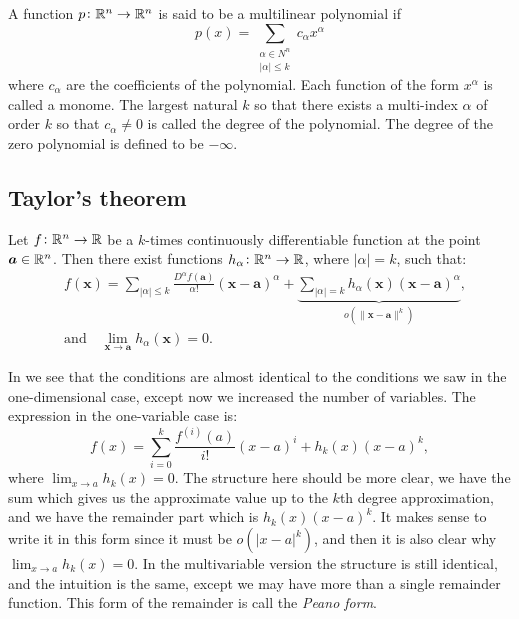 \documentclass[11pt,a4paper]{article}
\begin{document}
\begin{definition}
  A function $p \colon \mathbb{R}^n \to \mathbb{R}^n$ is said to be a multilinear polynomial
  if
  \[
    p(x) =
    \sum_{\substack{\alpha \in N^n \\ |\alpha| \le k}} c_{\alpha} x^{\alpha}
  \]
  where $c_{\alpha}$ are the coefficients of the polynomial.
  Each function of the form $x^{\alpha}$ is called a monome.
  The largest natural $k$ so that there exists a multi-index $\alpha$
  of order $k$ so that $c_{\alpha} \neq 0$ is called the degree
  of the polynomial.
  The degree of the zero polynomial is defined to be $-\infty$.
\end{definition}

\subsection{Taylor's theorem}
\begin{theorem}
  \label{thm:multivariable-taylor}
Let $f \colon \mathbb{R}^n \to \mathbb{R}$ be a $k$-times continuously differentiable 
function at the point $\boldsymbol{a} \in \mathbb{R}^n$. Then there exist functions 
$h_\alpha \colon \mathbb{R}^n \to \mathbb{R}$, where $|\alpha| = k$, such that:
\[
  {\begin{aligned}&f({\boldsymbol {x}})=\sum _{|\alpha |\leq k}{\frac 
  {D^{\alpha }f({\boldsymbol {a}})}{\alpha !}}({\boldsymbol {x}}-
  {\boldsymbol 
  {a}})^{\alpha }+\underbrace{\sum _{|\alpha |=k}h_{\alpha }({\boldsymbol 
  {x}})({\boldsymbol {x}}-{\boldsymbol {a}})^{\alpha }}_{o(\|\boldsymbol{x}-\boldsymbol{a}\|
  ^k)},\\&{\mbox{and}}\quad \lim _{{\boldsymbol {x}}\to {\boldsymbol {a}}}
  h_{\alpha }({\boldsymbol {x}})=0.\end{aligned}}
\]
\end{theorem}

\begin{remark}
  In  we see
  that the conditions are almost identical to the conditions we saw
  in the one-dimensional case, except now we increased the number
  of variables.
  The expression in the one-variable case is:
  \[
    f(x) = \sum_{i=0}^{k} \frac{f^{(i)}(a)}{i!} (x - a)^i + h_k(x) (x - a)^{k},
  \]
  where $\lim_{x \to a} h_k(x) = 0$.
  The structure here should be more clear,
  we have the sum which gives us the approximate value up to the $k$th
  degree approximation, and we have the remainder part which is
  $h_k(x) (x - a)^{k}$.
  It makes sense to write it in this form since it must be $o(|x - a|^k)$,
  and then it is also clear why $\lim_{x \to a} h_k(x) = 0$.
  In the multivariable version the structure is still identical,
  and the intuition is the same, except we may have more than a single
  remainder function.
  This form of the remainder is call the \textit{Peano form}.
\end{remark}
\end{document}
